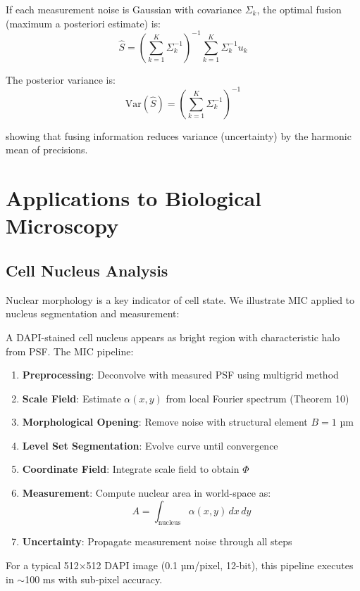 \documentclass[twocolumn,11pt]{article}
\begin{document}
\begin{theorem}
If each measurement noise is Gaussian with covariance $\Sigma_k$, the optimal fusion (maximum a posteriori estimate) is:
\begin{equation}
\hat{S} = \left(\sum_{k=1}^K \Sigma_k^{-1}\right)^{-1} \sum_{k=1}^K \Sigma_k^{-1} u_k
\end{equation}

The posterior variance is:
\begin{equation}
\text{Var}(\hat{S}) = \left(\sum_{k=1}^K \Sigma_k^{-1}\right)^{-1}
\end{equation}

showing that fusing information reduces variance (uncertainty) by the harmonic mean of precisions.
\end{theorem}

\section{Applications to Biological Microscopy}

\subsection{Cell Nucleus Analysis}

Nuclear morphology is a key indicator of cell state. We illustrate MIC applied to nucleus segmentation and measurement:

\begin{example}
A DAPI-stained cell nucleus appears as bright region with characteristic halo from PSF. The MIC pipeline:

\begin{enumerate}
\item \textbf{Preprocessing}: Deconvolve with measured PSF using multigrid method
\item \textbf{Scale Field}: Estimate $\alpha(x,y)$ from local Fourier spectrum (Theorem 10)
\item \textbf{Morphological Opening}: Remove noise with structural element $B = 1\text{ µm}$
\item \textbf{Level Set Segmentation}: Evolve curve until convergence
\item \textbf{Coordinate Field}: Integrate scale field to obtain $\Phi$
\item \textbf{Measurement}: Compute nuclear area in world-space as:
\begin{equation}
A = \int_{\text{nucleus}} \alpha(x,y) \, dx \, dy
\end{equation}
\item \textbf{Uncertainty}: Propagate measurement noise through all steps
\end{enumerate}

For a typical 512×512 DAPI image (0.1 µm/pixel, 12-bit), this pipeline executes in $\sim$100 ms with sub-pixel accuracy.
\end{example}
\end{document}
